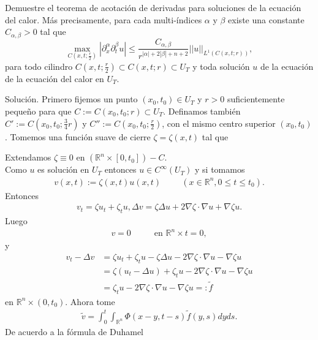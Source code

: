 \begin{homeworkProblem}
  Demuestre el teorema de acotación de derivadas para soluciones de la ecuación del calor. Más precisamente, para cada multi-índices $\alpha$ y $\beta$ existe una constante $C_{\alpha, \beta} > 0$ tal que
  \begin{equation*}
    \max_{C(x, t; \frac{r}{2})} |\partial_{x}^{\alpha} \partial_{t}^{\beta}u| \leq \dfrac{C_{\alpha, \beta}}{r^{|\alpha|+2|\beta|+n+2}}||u||_{L^{1}(C(x,t;r))}, 
  \end{equation*}
  para todo cilindro $C(x,t;\frac{r}{2}) \subset C(x,t;r) \subset U_{T}$ y toda solución $u$ de la ecuación de la ecuación del calor en $U_{T}$.
  \begin{solucion}
    Solución. Primero fijemos un punto $(x_{0}, t_{0}) \in U_{T}$ y $r>0$ suficientemente pequeño para que $C:=C(x_{0}, t_{0};r) \subset U_{T}$. Definamos también $C':=C(x_{0}, t_{0};\frac{3}{4}r)$ y $C'':=C(x_{0}, t_{0};\frac{r}{2})$, con el mismo centro superior $(x_{0}, t_{0})$.
    Tomemos una función suave de cierre $\zeta = \zeta(x,t)$ tal que
    
    Extendamos $\zeta \equiv 0$ en $(\mathbb{R}^{n} \times [0,t_{0}]) - C$.\\
    Como $u$ es solución en $U_{T}$ entonces $u \in C^{\infty}(U_{T})$ y si tomamos
    \begin{align*}
      v(x,t) := \zeta(x,t)u(x,t) \hspace{1cm} (x\in \mathbb{R}^{n}, 0 \leq t \leq t_{0}). 
    \end{align*}
    Entonces 
    \begin{align*}
      v_{t} = \zeta u_{t} + \zeta_{t}u, \Delta v = \zeta \Delta u + 2 \nabla \zeta \cdot \nabla u + \nabla \zeta u.
    \end{align*}
    Luego 
    \begin{align*}
      v = 0 \hspace{1cm} \text{   en } \mathbb{R}^{n} \times {t=0},
    \end{align*}
    y
    \begin{align*}
      v_{t} - \Delta v &= \zeta u_{t} + \zeta_{t}u - \zeta \Delta u - 2 \nabla \zeta \cdot \nabla u - \nabla \zeta u\\
        &= \zeta (u_{t} - \Delta u) + \zeta_{t}u - 2 \nabla \zeta \cdot \nabla u - \nabla \zeta u\\
        &= \zeta_{t}u - 2 \nabla \zeta \cdot \nabla u - \nabla \zeta u =: \tilde{f}
    \end{align*}
    en $\mathbb{R}^{n} \times (0,t_{0})$. Ahora tome
    \begin{align*}
      \tilde{v} = \int_{0}^{t} \int_{\mathbb{R}^{n}} \Phi(x-y, t-s) \tilde{f}(y,s) dyds.  
    \end{align*}
    De acuerdo a la fórmula de Duhamel
    \demostrado
  \end{solucion}  
\end{homeworkProblem}
